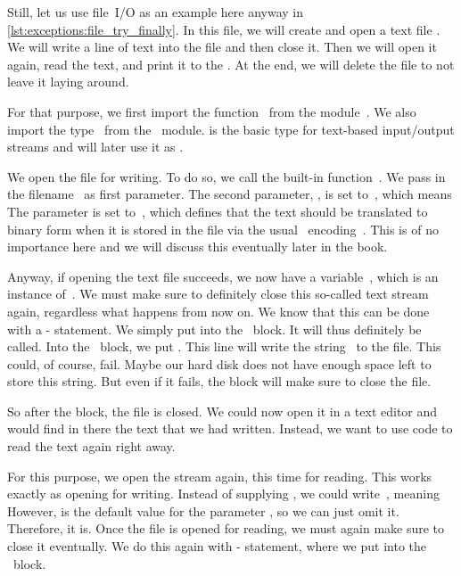 Still, let us use file~I/O as an example here anyway in \cref{lst:exceptions:file_try_finally}.
In this file, we will create and open a text file .
We will write a line of text into the file and then close it.
Then we will open it again, read the text, and print it to the .
At the end, we will delete the file to not leave it laying around.

For that purpose, we first import the function~ from the module~.
We also import the type~ from the ~module.
 is the basic type for text-based input/output streams and will later use it as .

We open the file  for writing.
To do so, we call the built-in function~.
We pass in the filename~ as first parameter.
The second parameter, , is set to~, which means 
The parameter  is set to~, which defines that the text should be translated to binary form when it is stored in the file via the usual ~encoding~\cite{RFC3629,ISOIEC106462020ITUCCSU}.
This is of no importance here and we will discuss this eventually later in the book.

Anyway, if opening the text file succeeds, we now have a variable~, which is an instance of~.
We must make sure to definitely close this so-called text stream again, regardless what happens from now on.
We know that this can be done with a - statement.
We simply put  into the ~block.
It will thus definitely be called.
Into the ~block, we put .
This line will write the string~ to the file.
This could, of course, fail.
Maybe our hard disk does not have enough space left to store this string.
But even if it fails, the  block will make sure to close the file.

So after the block, the file is closed.
We could now open it in a text editor and would find in there the text that we had written.
Instead, we want to use code to read the text again right away.

For this purpose, we open the stream again, this time for reading.
This works exactly as opening for writing.
Instead of supplying , we could write~, meaning 
However,  is the default value for the parameter , so we can just omit it.
Therefore,  it is.
Once the file is opened for reading, we must again make sure to close it eventually.
We do this again with - statement, where we put  into the ~block.

